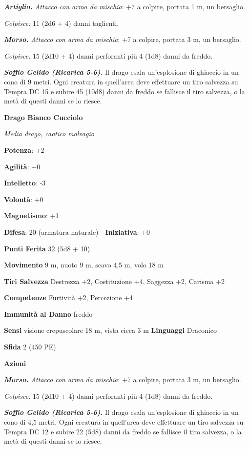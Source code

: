 \begin{multicols}{2}
\emph{\textbf{Artiglio.} Attacco con arma da mischia}: +7 a colpire,
portata 1 m, un bersaglio.

\emph{Colpisce:} 11 (2d6 + 4) danni taglienti.

\emph{\textbf{Morso.} Attacco con arma da mischia}: +7 a colpire,
portata 3 m, un bersaglio.

\emph{Colpisce:} 15 (2d10 + 4) danni perforanti più 4 (1d8) danni da
freddo.

\emph{\textbf{Soffio Gelido (Ricarica 5-6).}} Il drago esala
un'esplosione di ghiaccio in un cono di 9 metri. Ogni creatura in
quell'area deve effettuare un tiro salvezza su Tempra DC 15 e
subire 45 (10d8) danni da freddo se fallisce il tiro salvezza, o la metà
di questi danni se lo riesce.

\textbf{Drago Bianco Cucciolo}

\emph{Media drago, caotico malvagio}

\textbf{Potenza}: +2

\textbf{Agilità}: +0

\textbf{Intelletto}: -3

\textbf{Volontà}: +0

\textbf{Magnetismo}: +1

\textbf{Difesa}: 20 (armatura naturale) - \textbf{Iniziativa}: +0

\textbf{Punti Ferita} 32 (5d8 + 10)

\textbf{Movimento} 9 m, nuoto 9 m, scavo 4,5 m, volo 18 m

\textbf{Tiri Salvezza} Destrezza +2, Costituzione +4, Saggezza +2,
Carisma +2

\textbf{Competenze} Furtività +2, Percezione +4

\textbf{Immunità al Danno} freddo

\textbf{Sensi} visione crepuscolare 18 m, vista cieca 3 m
\textbf{Linguaggi} Draconico

\textbf{Sfida} 2 (450 PE)\smallskip

\smallskip\textbf{Azioni}

\emph{\textbf{Morso.} Attacco con arma da mischia}: +7 a colpire,
portata 3 m, un bersaglio.

\emph{Colpisce:} 15 (2d10 + 4) danni perforanti più 4 (1d8) danni da
freddo.

\emph{\textbf{Soffio Gelido (Ricarica 5-6).}} Il drago esala
un'esplosione di ghiaccio in un cono di 4,5 metri. Ogni creatura in
quell'area deve effettuare un tiro salvezza su Tempra DC 12 e
subire 22 (5d8) danni da freddo se fallisce il tiro salvezza, o la metà
di questi danni se lo riesce.




\end{multicols}

